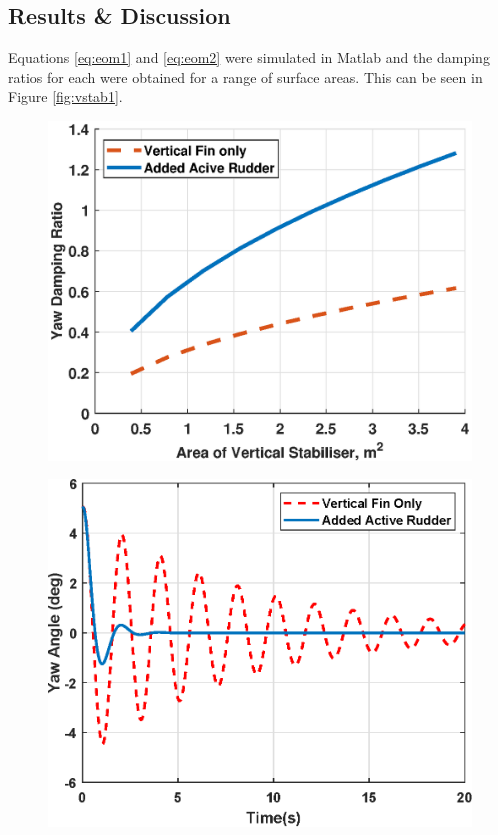 \documentclass[11pt,a4paper]{article}
\begin{document}
\subsection{Results \& Discussion}
Equations \ref{eq:eom1} and \ref{eq:eom2} were simulated in Matlab and the damping ratios for each were obtained for a range of surface areas. This can be seen in Figure \ref{fig:vstab1}.

\begin{figure}[H]
\centering
\begin{minipage}{.48\textwidth}
  \centering
  \includegraphics[width=\linewidth]{DampVArea3.eps}
  \label{fig:vstab1}
\end{minipage}\hspace{0.2cm}
\begin{minipage}{.48\textwidth}
  \centering
  \includegraphics[width=0.9\linewidth]{Vstabresp2.eps}
  \label{fig:vstab2}
\end{minipage}
\end{figure}
\end{document}
